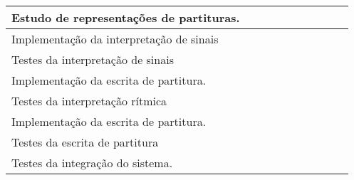 {\begin{adjustbox}{max width=\textwidth}
\begin{table}[]
\begin{tabular}{@{}llllllllll@{}}
\multicolumn{1}{|l|}{Estudo de representações de partituras.} & \multicolumn{1}{l|}{} & \multicolumn{1}{l|}{} & \multicolumn{1}{l|}{\cellcolor[HTML]{656565}} & \multicolumn{1}{l|}{} & \multicolumn{1}{l|}{} & \multicolumn{1}{l|}{} & \multicolumn{1}{l|}{} & \multicolumn{1}{l|}{} & \multicolumn{1}{l|}{} \\ \midrule
\multicolumn{1}{|l|}{Implementação da interpretação de sinais} & \multicolumn{1}{l|}{} & \multicolumn{1}{l|}{} & \multicolumn{1}{l|}{\cellcolor[HTML]{656565}} & \multicolumn{1}{l|}{\cellcolor[HTML]{656565}} & \multicolumn{1}{l|}{} & \multicolumn{1}{l|}{} & \multicolumn{1}{l|}{} & \multicolumn{1}{l|}{} & \multicolumn{1}{l|}{} \\ \midrule
\multicolumn{1}{|l|}{Testes da interpretação de sinais} & \multicolumn{1}{l|}{} & \multicolumn{1}{l|}{} & \multicolumn{1}{l|}{} & \multicolumn{1}{l|}{\cellcolor[HTML]{656565}} & \multicolumn{1}{l|}{} & \multicolumn{1}{l|}{} & \multicolumn{1}{l|}{} & \multicolumn{1}{l|}{} & \multicolumn{1}{l|}{} \\ \midrule
\multicolumn{1}{|l|}{Implementação da escrita de partitura.} & \multicolumn{1}{l|}{} & \multicolumn{1}{l|}{} & \multicolumn{1}{l|}{} & \multicolumn{1}{l|}{} & \multicolumn{1}{l|}{\cellcolor[HTML]{656565}} & \multicolumn{1}{l|}{\cellcolor[HTML]{656565}} & \multicolumn{1}{l|}{} & \multicolumn{1}{l|}{} & \multicolumn{1}{l|}{} \\ \midrule
\multicolumn{1}{|l|}{Testes da interpretação rítmica} & \multicolumn{1}{l|}{} & \multicolumn{1}{l|}{} & \multicolumn{1}{l|}{} & \multicolumn{1}{l|}{} & \multicolumn{1}{l|}{} & \multicolumn{1}{l|}{\cellcolor[HTML]{656565}} & \multicolumn{1}{l|}{} & \multicolumn{1}{l|}{} & \multicolumn{1}{l|}{} \\ \midrule
\multicolumn{1}{|l|}{Implementação da escrita de partitura.} & \multicolumn{1}{l|}{} & \multicolumn{1}{l|}{} & \multicolumn{1}{l|}{} & \multicolumn{1}{l|}{} & \multicolumn{1}{l|}{} & \multicolumn{1}{l|}{} & \multicolumn{1}{l|}{\cellcolor[HTML]{656565}} & \multicolumn{1}{l|}{\cellcolor[HTML]{656565}} & \multicolumn{1}{l|}{} \\ \midrule
\multicolumn{1}{|l|}{Testes da escrita de partitura} & \multicolumn{1}{l|}{} & \multicolumn{1}{l|}{} & \multicolumn{1}{l|}{} & \multicolumn{1}{l|}{} & \multicolumn{1}{l|}{} & \multicolumn{1}{l|}{} & \multicolumn{1}{l|}{} & \multicolumn{1}{l|}{\cellcolor[HTML]{656565}} & \multicolumn{1}{l|}{} \\ \midrule
Testes da integração do sistema. &  &  &  &  &  &  &  & \cellcolor[HTML]{656565} & \cellcolor[HTML]{656565} \\ \bottomrule
\end{tabular}
\end{table}
\end{adjustbox}
}


